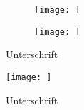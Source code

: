 \begin{figure}[h!]
	\centering
	\begin{subfigure}{0.9\textwidth}
	\texttt{[image: ]}
	\end{subfigure}
	\begin{subfigure}{0.9\textwidth}
	\texttt{[image: ]}
	\end{subfigure}
	\caption{Unterschrift}
	\label{fig:label}
\end{figure}

\begin{figure}[h!]
	\centering
	\texttt{[image: ]}
	\caption{Unterschrift}
	\label{fig:label}
\end{figure}